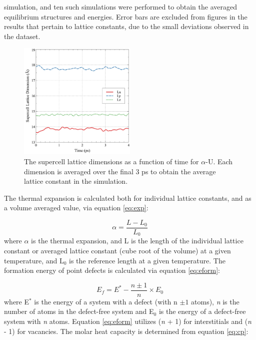 \documentclass[utf8]{frontiersSCNS} %
\begin{document}
simulation, and ten such simulations were performed to obtain the averaged equilibrium structures and energies. Error bars are excluded from figures in the results that pertain to lattice constants, due to the small deviations observed in the dataset. 

 \begin{figure}[hbt]
	\centering
	\includegraphics[width=0.5\textwidth]{trajectory.jpg}
  \caption{The supercell lattice dimensions as a function of time for $\alpha$-U. Each dimension is averaged over the final 3 ps to obtain the average lattice constant in the simulation. }\label{fig:traj}
\end{figure}

The thermal expansion is calculated both for individual lattice constants, and as a volume averaged value, via equation \ref{eq:exp}:

\begin{equation}
\label{eq:exp}
\alpha = \frac{L-L_0}{L_0} 
\end{equation}where $\alpha$ is the thermal expansion, and L is the length of the individual lattice constant or averaged lattice constant (cube root of the volume) at a given temperature, and L$_0$ is the reference length at a given temperature. The formation energy of point defects is calculated via equation \ref{eq:eform}: 

\begin{equation}
\label{eq:eform}
E_f = E^* - \frac{n \pm 1}{n} \times E_0
\end{equation}where E$^{*}$ is the energy of a system with a defect (with n $\pm 1$ atoms), \textit{n} is the number of atoms in the defect-free system and E$_{0}$ is the energy of a defect-free system with \textit{n} atoms. Equation \ref{eq:eform} utilizes (\textit{n} + 1) for interstitials and (\textit{n} - 1) for vacancies. The molar heat capacity is determined from equation \ref{eq:cp}:
\end{document}
